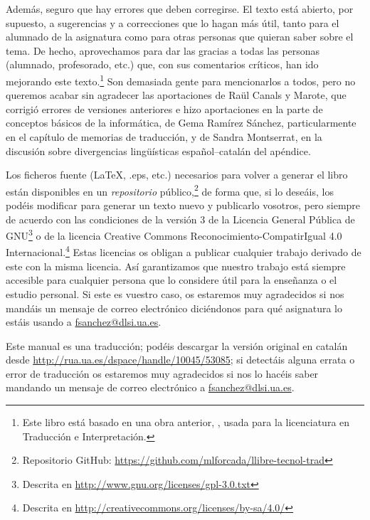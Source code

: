 Además, seguro que hay errores que deben corregirse. El texto está abierto, por supuesto, a sugerencias y a correcciones que lo hagan más útil, tanto para el alumnado de la asignatura como para otras personas que quieran saber sobre el tema. De hecho, aprovechamos para dar las gracias a todas las personas (alumnado, profesorado, etc.) que, con sus comentarios críticos, han ido mejorando este texto.\footnote{Este libro está basado en una obra anterior, \protect\citep{forcada09b}, usada para la licenciatura en Traducción e Interpretación.} Son demasiada gente para mencionarlos a todos, pero no queremos acabar sin agradecer las aportaciones de Raül Canals y Marote, que corrigió errores de versiones anteriores e hizo aportaciones en la parte de conceptos básicos de la informática, de Gema Ramírez Sánchez, particularmente en el capítulo de memorias de traducción, y de Sandra Montserrat, en la discusión sobre divergencias lingüísticas español--catalán del apéndice. 

Los ficheros fuente (\LaTeX, .eps, etc.) necesarios para volver a generar el libro están disponibles en un \emph{repositorio} público,\footnote{Repositorio GitHub: \url{https://github.com/mlforcada/llibre-tecnol-trad}} de forma que, si lo deseáis, los podéis modificar para generar un texto nuevo y publicarlo vosotros, pero siempre de acuerdo con las condiciones de la versión 3 de la Licencia General Pública de GNU\footnote{Descrita en \url{http://www.gnu.org/licenses/gpl-3.0.txt}} o de la licencia Creative Commons Reconocimiento-CompatirIgual 4.0 Internacional.\footnote{Descrita en \url{http://creativecommons.org/licenses/by-sa/4.0/}} Estas licencias os obligan a publicar cualquier trabajo derivado de este con la misma licencia. Así garantizamos que nuestro trabajo está siempre accesible para cualquier persona que lo considere útil para la enseñanza o el estudio personal. Si este es vuestro caso, os estaremos muy agradecidos si nos mandáis un mensaje de correo electrónico diciéndonos para qué asignatura lo estáis usando a \url{fsanchez@dlsi.ua.es}. 

Este manual es una traducción; podéis descargar la versión original en catalán desde \url{http://rua.ua.es/dspace/handle/10045/53085}; si detectáis alguna errata o error de traducción os estaremos muy agradecidos si nos lo hacéis saber mandando un mensaje de correo electrónico a \url{fsanchez@dlsi.ua.es}.

